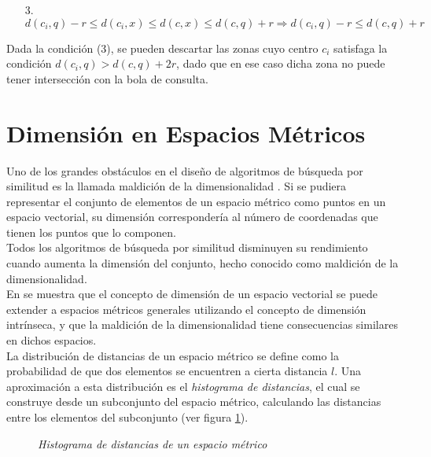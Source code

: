 \begin{enumerate}
\item [3.] $d(c_i,q) - r \leq d(c_i,x) \leq d(c,x) \leq d(c,q) + r \Rightarrow d(c_i,q) - r \leq d(c,q) + r$
\end{enumerate}

Dada la condici\'on (3), se pueden descartar las zonas cuyo centro $c_i$ satisfaga la condici\'on $d(c_i,q)  > d(c,q) +2r$, dado que en ese caso dicha zona no puede tener intersecci\'on con la bola de consulta.

\section{Dimensi\'on en Espacios M\'etricos}

Uno de los grandes obst\'aculos en el dise\~no de algoritmos de b\'usqueda por similitud es la llamada maldici\'on de la dimensionalidad \cite{oursurvey}. Si se pudiera representar el conjunto de elementos de un espacio m\'etrico como puntos en un espacio vectorial, su dimensi\'on corresponder\'ia al n\'umero de coordenadas que tienen los puntos que lo componen. \\

Todos los algoritmos de b\'usqueda por similitud disminuyen su rendimiento cuando aumenta la  dimensi\'on del conjunto, hecho conocido como maldici\'on de la dimensionalidad. \\

En \cite{oursurvey} se muestra que el concepto de dimensi\'on de un espacio vectorial se puede extender a espacios m\'etricos generales utilizando el concepto de dimensi\'on intr\'inseca, y que la maldici\'on de la dimensionalidad tiene consecuencias similares en dichos espacios.\\

La distribuci\'on de distancias de un espacio m\'etrico se define como la probabilidad de que dos elementos se encuentren a cierta distancia $l$. Una aproximaci\'on a esta distribuci\'on es el \textit{histograma de distancias}, el cual se construye desde un subconjunto del espacio m\'etrico, calculando las distancias entre los elementos del subconjunto (ver figura \ref{defineH}).\\
 
 \begin{figure}[tb!]
\centerline{%
  }
  \caption [Histograma de distancias de un espacio m\'etrico]
  {\footnotesize {\textsl {Histograma de distancias de un espacio m\'etrico}}}
\label{defineH}
\end{figure}

